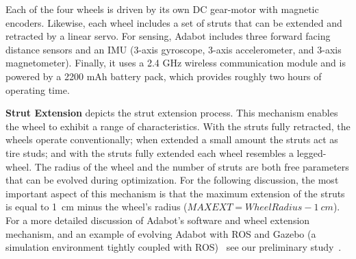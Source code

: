 Each of the four wheels is driven by its own DC gear-motor with magnetic encoders.
%
Likewise, each wheel includes a set of struts that can be extended and retracted by a linear servo.
%
For sensing, Adabot includes three forward facing distance sensors and an IMU (3-axis gyroscope, 3-axis accelerometer, and 3-axis magnetometer).
%
Finally, it uses a 2.4 GHz wireless communication module and is powered by a 2200 mAh battery pack, which provides roughly two hours of operating time.


\vspace{0.1in}
\noindent
\textbf{Strut Extension}
%
 depicts the strut extension process.
%
This mechanism enables the wheel to exhibit a range of characteristics.
%
With the struts fully retracted, the wheels operate conventionally; when extended a small amount the struts act as tire studs; and with the struts fully extended each wheel resembles a legged-wheel.
%
The radius of the wheel and the number of struts are both free parameters that can be evolved during optimization.
%
For the following discussion, the most important aspect of this mechanism is that the maximum extension of the struts is equal to 1~\si{cm} minus the wheel's radius ($\mathit{MAXEXT} = \mathit{WheelRadius} - 1~\si{cm}$).
%
For a more detailed discussion of Adabot's software and wheel extension mechanism, and an example of evolving Adabot with ROS and Gazebo (a simulation environment tightly coupled with ROS)~\parencite{Koenig.IROS.Gazebo.2004} see our preliminary study~.



